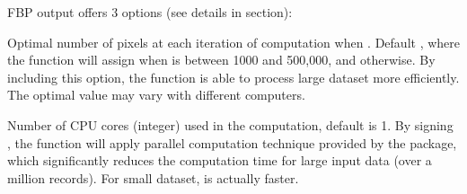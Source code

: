 \documentclass[a4paper]{book}
\begin{document}
\begin{Arguments}
\begin{ldescription}
\item[\code{output}] FBP output offers 3 options (see details in 
section):



\item[\code{m}] Optimal number of pixels at each iteration of computation when
. Default , where the function will
assign  when  is between 1000 and 500,000,
and  otherwise. By including this option, the function is
able to process large dataset more efficiently. The optimal value may vary
with different computers.

\item[\code{cores}] Number of CPU cores (integer) used in the computation, default
is 1.  By signing , the function will apply parallel
computation technique provided by the  package, which
significantly reduces the computation time for large input data (over a
million records). For small dataset,  is actually faster.
\end{ldescription}
\end{Arguments}
%
\end{document}
